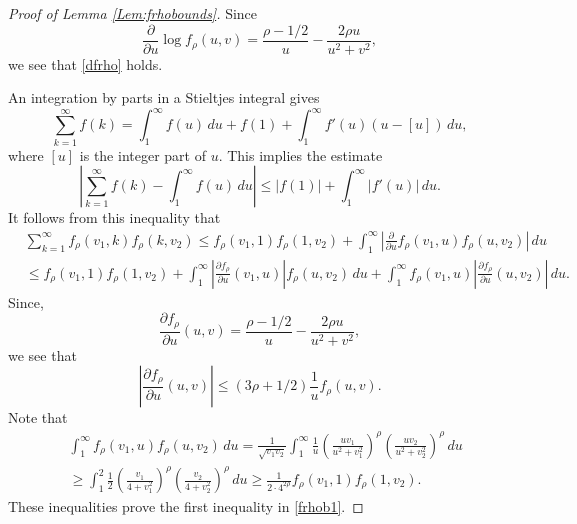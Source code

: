 \documentclass{article}
\numberwithin{equation}{section}
\numberwithin{figure}{section}
\theoremstyle{plain}
\theoremstyle{plain}
\numberwithin{thm}{section}
\theoremstyle{remark}
\let \le \leqslant
\let \ge \geqslant
\begin{document}
\begin{proof}[Proof of Lemma \ref{Lem:frhobounds}]
Since
\begin{equation*}
    \frac{\partial}{\partial u}\log f_\rho(u,v)=\frac{\rho-1/2}{u}-
    \frac{2\rho u}{u^2+v^2},
\end{equation*}
we see that \eqref{dfrho} holds.

An integration by parts in a Stieltjes integral gives
\begin{equation*}
\sum_{k=1}^\infty f(k)=\int_1^\infty f(u)\,du+f(1)+\int_1^\infty f'(u)(u-[u])\,du,
\end{equation*}
where $[u]$ is the integer part of $u$. This implies the estimate
\begin{equation}\label{sumint}
\left|\sum_{k=1}^\infty f(k)-\int_1^\infty f(u)\,du\right|\le |f(1)|+\int_1^\infty|f'(u)|\,du.
\end{equation}
It follows from this inequality that
\begin{align*}
&\sum_{k=1}^\infty f_\rho(v_1,k)f_\rho(k,v_2)\le f_\rho(v_1,1)f_\rho(1,v_2)+\int_1^\infty  \left|\frac{\partial}{\partial u}f_\rho(v_1,u)f_\rho(u,v_2)\right|\,du\\
&\le f_\rho(v_1,1)f_\rho(1,v_2)+\int_1^\infty\left|\frac{\partial f_\rho}{\partial u}(v_1,u)\right|f_\rho(u,v_2)\,du
+\int_1^\infty f_\rho(v_1,u)\left|\frac{\partial f_\rho}{\partial u}(u,v_2)\right|\,du.
\end{align*}
Since,
\begin{equation*}
\frac{\partial f_\rho}{\partial u}(u,v)=\frac{\rho-1/2}u-\frac{2\rho u}{u^2+v^2},
\end{equation*}
we see that
\begin{equation*}
\left|\frac{\partial f_\rho}{\partial u}(u,v)\right|\le (3\rho+1/2)\frac 1u f_\rho(u,v).
\end{equation*}
Note that
\begin{align*}
&\int_1^\infty f_\rho(v_1,u)f_\rho(u,v_2)\,du=\frac 1{\sqrt{v_1v_2}}\int_1^\infty\frac 1u\left(\frac{uv_1}{u^2+v_1^2}\right)^\rho\left(\frac{uv_2}{u^2+v_2^2}\right)^\rho\,du\\
&\ge \int_1^2\frac 12\left(\frac{v_1}{4+v_1^2}\right)^\rho\left(\frac{v_2}{4+v_2^2}\right)^\rho\,du\ge \frac 1{2\cdot 4^{2\rho}}f_\rho(v_1,1)f_\rho(1,v_2).
\end{align*}
These inequalities prove the first inequality in \eqref{frhob1}.


\end{proof}
\end{document}
